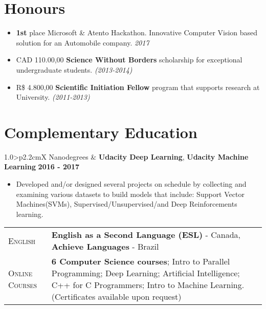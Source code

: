 \documentclass[9pt, a4paper, oneside, final]{scrartcl} %
\newcommand{\gray}{\rowcolor[gray]{.90}} %
\begin{document}
\section{Honours}

\begin{itemize}\itemsep1.0pt \parskip0pt 
\item \textbf{1st} place Microsoft \& Atento Hackathon. Innovative Computer Vision based solution for an Automobile company. \textit{2017}

\item CAD 110.00,00 \textbf{Science Without Borders} scholarship for exceptional undergraduate students. \textit{(2013-2014)}

\item R\$ 4.800,00 \textbf{Scientific Initiation Fellow} program that supports  research at University.\textit{ (2011-2013)}
\end{itemize} 

\section{Complementary Education}

\begin{center}
\begin{tabularx}{1.0\linewidth}{>{\raggedleft\scshape}p{2.2cm}X}
\gray Nanodegrees & \textbf{Udacity Deep Learning}, \textbf{Udacity Machine Learning} \hfill \textbf{2016 - 2017}\\
\end{tabularx}
\end{center}

\begin{itemize}
\item Developed and/or designed several projects on schedule by collecting and examining various datasets to build models that include: Support Vector Machines(SVMs), Supervised/Unsupervised/and Deep Reinforcements learning.
\end{itemize}

\begin{center}
\begin{tabularx}{1.0\linewidth}{>{\raggedleft\scshape}p{2.0cm}X}
\gray English & \textbf{English as a Second Language (ESL)} - Canada, 
          \textbf{Achieve Languages} - Brazil\\
\gray Online Courses & \textbf{6 Computer Science courses}; Intro to Parallel Programming; Deep Learning; Artificial Intelligence; C++ for C Programmers; Intro to Machine Learning. (Certificates available upon request)
\end{tabularx}
\end{center}
\end{document}
